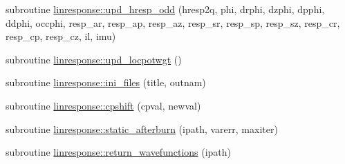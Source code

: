\begin{DoxyCompactItemize}
\item 
subroutine \hyperlink{namespacelinresponse_a4a85727caa626cd05a3656233f05dc8d}{linresponse\+::upd\+\_\+hresp\+\_\+odd} (hresp2q, phi, drphi, dzphi, dpphi, ddphi, occphi, resp\+\_\+ar, resp\+\_\+ap, resp\+\_\+az, resp\+\_\+sr, resp\+\_\+sp, resp\+\_\+sz, resp\+\_\+cr, resp\+\_\+cp, resp\+\_\+cz, il, imu)
\item 
subroutine \hyperlink{namespacelinresponse_ab96bf307cf27ab53f89611b635f2fa28}{linresponse\+::upd\+\_\+locpotwgt} ()
\item 
subroutine \hyperlink{namespacelinresponse_a6b8f38f93468b890f753104248cd0f29}{linresponse\+::ini\+\_\+files} (title, outnam)
\item 
subroutine \hyperlink{namespacelinresponse_a5340ecb0ff19e7647002c98f61fecf3c}{linresponse\+::cpshift} (cpval, newval)
\item 
subroutine \hyperlink{namespacelinresponse_abc6223efc1cc1c1426030732e5db06f0}{linresponse\+::static\+\_\+afterburn} (ipath, varerr, maxiter)
\item 
subroutine \hyperlink{namespacelinresponse_a654f4030a490a074dbdc40ae9af28e32}{linresponse\+::return\+\_\+wavefunctions} (ipath)
\end{DoxyCompactItemize}
